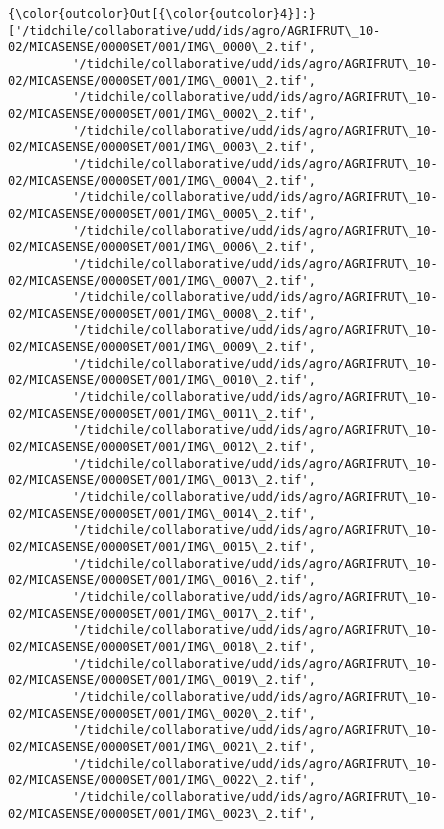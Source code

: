 \documentclass[11pt]{article}
\begin{document}
\begin{Verbatim}[commandchars=\\\{\}]
{\color{outcolor}Out[{\color{outcolor}4}]:} ['/tidchile/collaborative/udd/ids/agro/AGRIFRUT\_10-02/MICASENSE/0000SET/001/IMG\_0000\_2.tif',
         '/tidchile/collaborative/udd/ids/agro/AGRIFRUT\_10-02/MICASENSE/0000SET/001/IMG\_0001\_2.tif',
         '/tidchile/collaborative/udd/ids/agro/AGRIFRUT\_10-02/MICASENSE/0000SET/001/IMG\_0002\_2.tif',
         '/tidchile/collaborative/udd/ids/agro/AGRIFRUT\_10-02/MICASENSE/0000SET/001/IMG\_0003\_2.tif',
         '/tidchile/collaborative/udd/ids/agro/AGRIFRUT\_10-02/MICASENSE/0000SET/001/IMG\_0004\_2.tif',
         '/tidchile/collaborative/udd/ids/agro/AGRIFRUT\_10-02/MICASENSE/0000SET/001/IMG\_0005\_2.tif',
         '/tidchile/collaborative/udd/ids/agro/AGRIFRUT\_10-02/MICASENSE/0000SET/001/IMG\_0006\_2.tif',
         '/tidchile/collaborative/udd/ids/agro/AGRIFRUT\_10-02/MICASENSE/0000SET/001/IMG\_0007\_2.tif',
         '/tidchile/collaborative/udd/ids/agro/AGRIFRUT\_10-02/MICASENSE/0000SET/001/IMG\_0008\_2.tif',
         '/tidchile/collaborative/udd/ids/agro/AGRIFRUT\_10-02/MICASENSE/0000SET/001/IMG\_0009\_2.tif',
         '/tidchile/collaborative/udd/ids/agro/AGRIFRUT\_10-02/MICASENSE/0000SET/001/IMG\_0010\_2.tif',
         '/tidchile/collaborative/udd/ids/agro/AGRIFRUT\_10-02/MICASENSE/0000SET/001/IMG\_0011\_2.tif',
         '/tidchile/collaborative/udd/ids/agro/AGRIFRUT\_10-02/MICASENSE/0000SET/001/IMG\_0012\_2.tif',
         '/tidchile/collaborative/udd/ids/agro/AGRIFRUT\_10-02/MICASENSE/0000SET/001/IMG\_0013\_2.tif',
         '/tidchile/collaborative/udd/ids/agro/AGRIFRUT\_10-02/MICASENSE/0000SET/001/IMG\_0014\_2.tif',
         '/tidchile/collaborative/udd/ids/agro/AGRIFRUT\_10-02/MICASENSE/0000SET/001/IMG\_0015\_2.tif',
         '/tidchile/collaborative/udd/ids/agro/AGRIFRUT\_10-02/MICASENSE/0000SET/001/IMG\_0016\_2.tif',
         '/tidchile/collaborative/udd/ids/agro/AGRIFRUT\_10-02/MICASENSE/0000SET/001/IMG\_0017\_2.tif',
         '/tidchile/collaborative/udd/ids/agro/AGRIFRUT\_10-02/MICASENSE/0000SET/001/IMG\_0018\_2.tif',
         '/tidchile/collaborative/udd/ids/agro/AGRIFRUT\_10-02/MICASENSE/0000SET/001/IMG\_0019\_2.tif',
         '/tidchile/collaborative/udd/ids/agro/AGRIFRUT\_10-02/MICASENSE/0000SET/001/IMG\_0020\_2.tif',
         '/tidchile/collaborative/udd/ids/agro/AGRIFRUT\_10-02/MICASENSE/0000SET/001/IMG\_0021\_2.tif',
         '/tidchile/collaborative/udd/ids/agro/AGRIFRUT\_10-02/MICASENSE/0000SET/001/IMG\_0022\_2.tif',
         '/tidchile/collaborative/udd/ids/agro/AGRIFRUT\_10-02/MICASENSE/0000SET/001/IMG\_0023\_2.tif',

\end{Verbatim}
\end{document}
